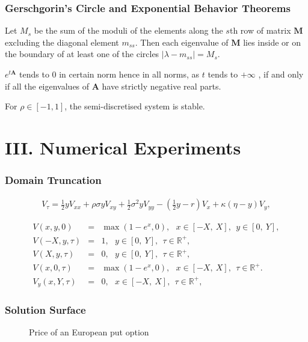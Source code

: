 \documentclass{beamer}
\newcommand{\bbbb}{\begin{eqnarray*}}
\newcommand{\eeee}{\end{eqnarray*}}
\def\l{\left}
\def\r{\right}
\begin{document}

\begin{frame}
\frametitle{Gerschgorin's Circle and Exponential Behavior Theorems}
\begin{theorem}

Let $M_s$ be the sum of the moduli of the elements along the $s$th row of matrix $\textbf{M}$ excluding the diagonal element $m_{ss}$. Then each eigenvalue of $\textbf{M}$ lies inside or on the boundary of at least one of the circles $|\lambda -m_{ss}|=M_s$. 
\end{theorem}

\pause

\begin{theorem}
$e^{t\textbf{A}}$ tends to 0 in certain norm hence in all norms, as $t$ tends to $+\infty$ , if and only if all the eigenvalues of $\textbf{A}$ have strictly negative real parts.
\end{theorem}
\pause
\begin{theorem}
For $\rho\in[-1,1]$, the semi-discretised system is stable.
\end{theorem}
\end{frame}


\section{III. Numerical Experiments}
\begin{frame}
\frametitle{Domain Truncation}

\bbbb
V_\tau = \frac{1}{2}yV_{xx}+\rho \sigma yV_{xy}+\frac{1}{2}\sigma^2 yV_{yy}-\l(\frac{1}{2}y-r\r)V_x+\kappa (\eta -y)V_y,
\eeee	
										

\bbbb
V(x,y,0) &=& \max\l(1-e^{x},0\r),~~~ x\in [-X,~X],~~ y\in [0,~Y],\\
V(-X,y,\tau) &=& 1,~~~y\in [0,~Y], ~~\tau\in\mathbb{R}^+,\\
V(X,y,\tau) &=& 0,~~~y\in [0,~Y], ~~\tau\in\mathbb{R}^+,\\
V(x,0,\tau) &=& \max\l(1-e^{x},0\r),~~~ x\in [-X,~X], ~~\tau\in\mathbb{R}^+.\\
V_y(x,Y,\tau) &=& 0,~~~ x\in [-X,~X],~~ \tau\in\mathbb{R}^+,
\eeee

\end{frame}


\begin{frame}
\frametitle{Solution Surface}
\begin{figure}
\begin{center}

{}

\caption{Price of an European put option}\label{figure:1}
\end{center}
\end{figure}
\end{frame}
\end{document}
